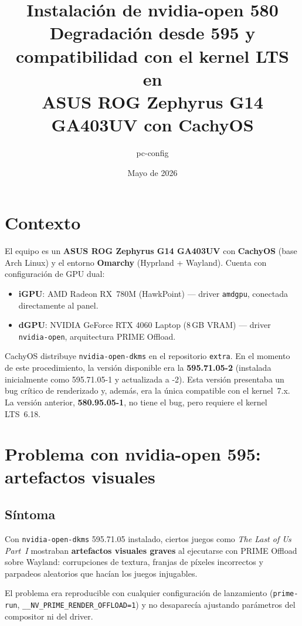 \documentclass[12pt,a4paper]{article}
\title{%
  \textbf{Instalación de nvidia-open 580}\\[0.4em]
  \large Degradación desde 595 y compatibilidad con el kernel LTS en\\
  ASUS ROG Zephyrus G14 GA403UV con CachyOS
}
\author{pc-config}
\date{Mayo de 2026}
\begin{document}
\maketitle
\tableofcontents
\newpage

\section{Contexto}

El equipo es un \textbf{ASUS ROG Zephyrus G14 GA403UV} con \textbf{CachyOS}
(base Arch Linux) y el entorno \textbf{Omarchy} (Hyprland + Wayland). Cuenta
con configuración de GPU dual:

\begin{itemize}
  \item \textbf{iGPU}: AMD Radeon RX~780M (HawkPoint) --- driver
        \texttt{amdgpu}, conectada directamente al panel.
  \item \textbf{dGPU}: NVIDIA GeForce RTX 4060 Laptop (8\,GB VRAM) ---
        driver \texttt{nvidia-open}, arquitectura PRIME Offload.
\end{itemize}

CachyOS distribuye \texttt{nvidia-open-dkms} en el repositorio
\texttt{extra}. En el momento de este procedimiento, la versión disponible
era la \textbf{595.71.05-2} (instalada inicialmente como 595.71.05-1 y
actualizada a -2). Esta versión presentaba un bug crítico de renderizado y,
además, era la única compatible con el kernel~7.x. La versión anterior,
\textbf{580.95.05-1}, no tiene el bug, pero requiere el kernel LTS~6.18.

\section{Problema con nvidia-open 595: artefactos visuales}

\subsection{Síntoma}

Con \texttt{nvidia-open-dkms} 595.71.05 instalado, ciertos juegos como
\emph{The Last of Us Part~I} mostraban \textbf{artefactos visuales graves}
al ejecutarse con PRIME Offload sobre Wayland: corrupciones de textura,
franjas de píxeles incorrectos y parpadeos aleatorios que hacían los juegos
injugables.

El problema era reproducible con cualquier configuración de lanzamiento
(\texttt{prime-run}, \texttt{\_\_NV\_PRIME\_RENDER\_OFFLOAD=1}) y no
desaparecía ajustando parámetros del compositor ni del driver.
\end{document}
